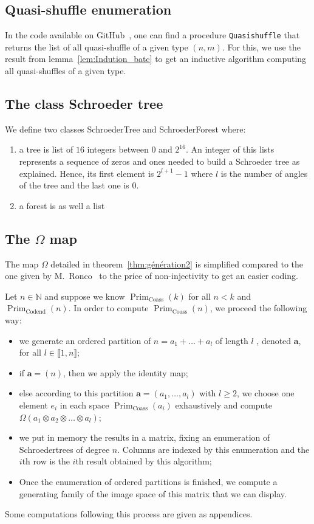 \documentclass[a4paper,10pt]{amsart}
\DeclareMathOperator{\Prim}{Prim}
\DeclareMathOperator{\Coass}{Coass}
\DeclareMathOperator{\Codend}{Codend}
\newcommand\NN{\mathbb{N}}
\newcommand{\IEM}[2]{\llbracket #1,#2 \rrbracket}
\newcommand{\Schw}{Schroeder} %
\theoremstyle{definition}
\begin{document}
\subsection{Quasi-shuffle enumeration}

In the code available on GitHub~\cite{Code}, one can find a procedure \lstinline[language=C++]|Quasishuffle| that returns the list of all quasi-shuffle of a given type $(n,m)$. For this, we use the result from lemma~\ref{lem:Indution_batc} to get an inductive algorithm computing all quasi-shuffles of a given type.

\subsection{The class \Schw{} tree}

We define two classes {\ttfamily \Schw{}Tree} and {\ttfamily \Schw{}Forest} where:
\begin{enumerate}
	\item a tree is list of $16$ integers between $0$ and $2^{16}$. An integer of this lists represents a sequence of zeros and ones needed to build a \Schw{} tree as explained. Hence, its first element is $2^{l+1}-1$ where $l$ is the number of angles of the tree and the last one is $0$. 
	\item a forest is as well a list 
\end{enumerate}

\subsection{The $\Omega$ map}

The map $\Omega$ detailed in theorem~\ref{thm:génération2} is simplified compared to the one given by M.~Ronco~\cite{euleridem} to the price of non-injectivity to get an easier coding.

Let $n\in\NN$ and suppose we know $\Prim_{\Coass}(k)$ for all $n<k$ and $\Prim_{\Codend}(n)$. In order to compute $\Prim_{\Coass}(n)$, we proceed the following way:
\begin{itemize}
	\item we generate an ordered partition of $n=a_1+\dots +a_l$ of length $l$ , denoted $\mathbf{a}$, for all $l\in\IEM{1}{n}$;
	\item if $\mathbf{a}=(n)$, then we apply the identity map;
	\item else according to this partition $\mathbf{a}=(a_1,\dots, a_l)$ with $l\geq 2$, we choose one element $e_i$ in each space $\Prim_{\Coass}(a_i)$ exhaustively and compute $\Omega(a_1\otimes a_2 \otimes \ldots \otimes a_l)$;
	\item we put in memory the results in a matrix, fixing an enumeration of \Schw trees of degree $n$. Columns are indexed by this enumeration and the $i$th row is the $i$th result obtained by this algorithm;
	\item Once the enumeration of ordered partitions is finished, we compute a generating family of the image space of this matrix that we can display.
\end{itemize}
Some computations following this process are given as appendices.
\end{document}
